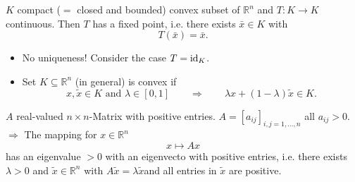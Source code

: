 \begin{theorem}
	$K$ compact ($=$ closed and bounded) convex subset of $\mathbb{R}^n$ and $T: K \to K$ continuous. Then $T$ has a fixed point, i.e. there exists $\bar{x} \in K$ with
	\[
		T(\bar{x}) = \bar{x}.
	\]
\end{theorem}
\begin{bemerkung}
	\begin{itemize}
		\item No uniqueness! Consider the case $T= \operatorname{id}_K$.
		\item Set $K \subseteq \mathbb{R}^n$ (in general) is convex if
		\[
			x, \tilde x \in K \text{ and } \lambda \in [0,1] \qquad \Rightarrow \qquad \lambda x + ( 1- \lambda)\tilde x \in K.
		\]
	\end{itemize}
\end{bemerkung}

\begin{theorem}
	$A$ real-valued $n \times n$-Matrix with positive entries. $A = [a_{ij}]_{i,j=1, \dots,n}$ all $a_{ij}>0$. \\
	$\Rightarrow $ The mapping for $x \in \mathbb{R}^n$ 
	\[
		x \mapsto Ax
	\]
	has an eigenvalue $>0$ with an eigenvecto with positive entries, i.e. there exists $\lambda >0$ and $\tilde x \in \mathbb{R}^n$ with $A \tilde x = \lambda \tilde x$and all entries in $\tilde x$ are positive.
\end{theorem}

